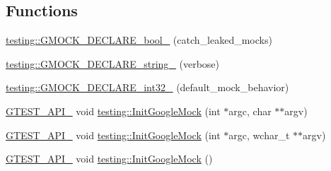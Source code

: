 \subsection*{Functions}
\begin{DoxyCompactItemize}
\item 
\mbox{\hyperlink{namespacetesting_a9dd7591091234b86ce48ce1aff6feeb5}{testing\+::\+G\+M\+O\+C\+K\+\_\+\+D\+E\+C\+L\+A\+R\+E\+\_\+bool\+\_\+}} (catch\+\_\+leaked\+\_\+mocks)
\item 
\mbox{\hyperlink{namespacetesting_a4dd099d1d538f26a16fcc2f94011b37e}{testing\+::\+G\+M\+O\+C\+K\+\_\+\+D\+E\+C\+L\+A\+R\+E\+\_\+string\+\_\+}} (verbose)
\item 
\mbox{\hyperlink{namespacetesting_a8db48e64b7ad3536f6ccf28ce39f9111}{testing\+::\+G\+M\+O\+C\+K\+\_\+\+D\+E\+C\+L\+A\+R\+E\+\_\+int32\+\_\+}} (default\+\_\+mock\+\_\+behavior)
\item 
\mbox{\hyperlink{_obj__test_2lib_2googletest-release-1_88_81_2googletest_2include_2gtest_2internal_2gtest-port_8h_aa73be6f0ba4a7456180a94904ce17790}{G\+T\+E\+S\+T\+\_\+\+A\+P\+I\+\_\+}} void \mbox{\hyperlink{namespacetesting_a32b1c6db9ba5133ccabfa67616b3c041}{testing\+::\+Init\+Google\+Mock}} (int $\ast$argc, char $\ast$$\ast$argv)
\item 
\mbox{\hyperlink{_obj__test_2lib_2googletest-release-1_88_81_2googletest_2include_2gtest_2internal_2gtest-port_8h_aa73be6f0ba4a7456180a94904ce17790}{G\+T\+E\+S\+T\+\_\+\+A\+P\+I\+\_\+}} void \mbox{\hyperlink{namespacetesting_a20fb86152763dddef67bc1dd8b090800}{testing\+::\+Init\+Google\+Mock}} (int $\ast$argc, wchar\+\_\+t $\ast$$\ast$argv)
\item 
\mbox{\hyperlink{_obj__test_2lib_2googletest-release-1_88_81_2googletest_2include_2gtest_2internal_2gtest-port_8h_aa73be6f0ba4a7456180a94904ce17790}{G\+T\+E\+S\+T\+\_\+\+A\+P\+I\+\_\+}} void \mbox{\hyperlink{namespacetesting_a9276d4bc746722cb4fe99415c1dc778f}{testing\+::\+Init\+Google\+Mock}} ()
\end{DoxyCompactItemize}
